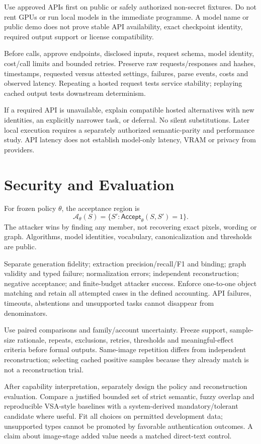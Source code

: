 \documentclass[11pt,a4paper]{article}
\newcommand{\Aset}{\mathcal{A}}
\begin{document}
Use approved APIs first on public or safely authorized non-secret fixtures. Do not rent GPUs or run local models in the immediate programme. A model name or public demo does not prove stable API availability, exact checkpoint identity, required output support or license compatibility.

Before calls, approve endpoints, disclosed inputs, request schema, model identity, cost/call limits and bounded retries. Preserve raw requests/responses and hashes, timestamps, requested versus attested settings, failures, parse events, costs and observed latency. Repeating a hosted request tests service stability; replaying cached output tests downstream determinism.

If a required API is unavailable, explain compatible hosted alternatives with new identities, an explicitly narrower task, or deferral. No silent substitutions. Later local execution requires a separately authorized semantic-parity and performance study. API latency does not establish model-only latency, VRAM or privacy from providers.

\section{Security and Evaluation}
For frozen policy $\theta$, the acceptance region is
\[
 \Aset_\theta(S)=\{S':\mathsf{Accept}_\theta(S,S')=1\}.
\]
The attacker wins by finding any member, not recovering exact pixels, wording or graph. Algorithms, model identities, vocabulary, canonicalization and thresholds are public.

Separate generation fidelity; extraction precision/recall/F1 and binding; graph validity and typed failure; normalization errors; independent reconstruction; negative acceptance; and finite-budget attacker success. Enforce one-to-one object matching and retain all attempted cases in the defined accounting. API failures, timeouts, abstentions and unsupported tasks cannot disappear from denominators.

Use paired comparisons and family/account uncertainty. Freeze support, sample-size rationale, repeats, exclusions, retries, thresholds and meaningful-effect criteria before formal outputs. Same-image repetition differs from independent reconstruction; selecting cached positive samples because they already match is not a reconstruction trial.

After capability interpretation, separately design the policy and reconstruction evaluation. Compare a justified bounded set of strict semantic, fuzzy overlap and reproducible VSA-style baselines with a system-derived mandatory/tolerant candidate where useful. Fit all choices on permitted development data; unsupported types cannot be promoted by favorable authentication outcomes. A claim about image-stage added value needs a matched direct-text control.
\end{document}
